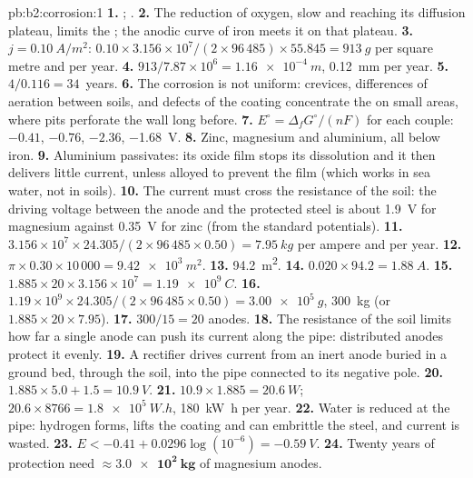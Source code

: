 \begin{solution}{pb:b2:corrosion:1}
\textbf{1.} ; .
\textbf{2.} The reduction of oxygen, slow and reaching its diffusion plateau,
limits the ; the anodic curve of iron meets it on that plateau.
\textbf{3.} $j = \qty{0.10}{A/m^2}$: $0.10 \times 3.156 \times 10^7/(2 \times 96\,485)
\times 55.845 = \qty{913}{g}$ per square metre and per year.
\textbf{4.} $913/7.87 \times 10^6 = \qty{1.16e-4}{m}$, \qty{0.12}{mm} per year.
\textbf{5.} $4/0.116 = 34$~years.
\textbf{6.} The corrosion is not uniform: crevices, differences of aeration
between soils, and defects of the coating concentrate the  on
small areas, where pits perforate the wall long before.
\textbf{7.} $E^\circ = \Delta_f G^\circ/(nF)$ for each couple:  $-0.41$,  $-0.76$,
 $-2.36$,  \qty{-1.68}{V}.
\textbf{8.} Zinc, magnesium and aluminium, all below iron.
\textbf{9.} Aluminium passivates: its oxide film stops its dissolution and it
then delivers little current, unless alloyed to prevent the film (which works
in sea water, not in soils).
\textbf{10.} The current must cross the resistance of the soil: the driving
voltage between the anode and the protected steel is about \qty{1.9}{V} for
magnesium against \qty{0.35}{V} for zinc (from the standard potentials).
\textbf{11.} $3.156 \times 10^7 \times 24.305/(2 \times 96\,485 \times 0.50) =
\qty{7.95}{kg}$ per ampere and per year.
\textbf{12.} $\pi \times 0.30 \times 10\,000 = \qty{9.42e3}{m^2}$.
\textbf{13.} \qty{94.2}{m^2}.
\textbf{14.} $0.020 \times 94.2 = \qty{1.88}{A}$.
\textbf{15.} $1.885 \times 20 \times 3.156 \times 10^7 = \qty{1.19e9}{C}$.
\textbf{16.} $1.19 \times 10^9 \times 24.305/(2 \times 96\,485 \times 0.50) =
\qty{3.00e5}{g}$, \qty{300}{kg} (or $1.885 \times 20 \times 7.95$).
\textbf{17.} $300/15 = 20$ anodes.
\textbf{18.} The resistance of the soil limits how far a single anode can push
its current along the pipe: distributed anodes protect it evenly.
\textbf{19.} A rectifier drives current from an inert anode buried in a ground
bed, through the soil, into the pipe connected to its negative pole.
\textbf{20.} $1.885 \times 5.0 + 1.5 = \qty{10.9}{V}$.
\textbf{21.} $10.9 \times 1.885 = \qty{20.6}{W}$; $20.6 \times 8766 = \qty{1.8e5}{W.h}$,
\qty{180}{kW.h} per year.
\textbf{22.} Water is reduced at the pipe: hydrogen forms, lifts the coating and
can embrittle the steel, and current is wasted.
\textbf{23.} $E < -0.41 + 0.0296\log(10^{-6}) = \qty{-0.59}{V}$.
\textbf{24.} Twenty years of protection need $\boldsymbol{\approx \qty{3.0e2}{kg}}$
of magnesium anodes.
\end{solution}
